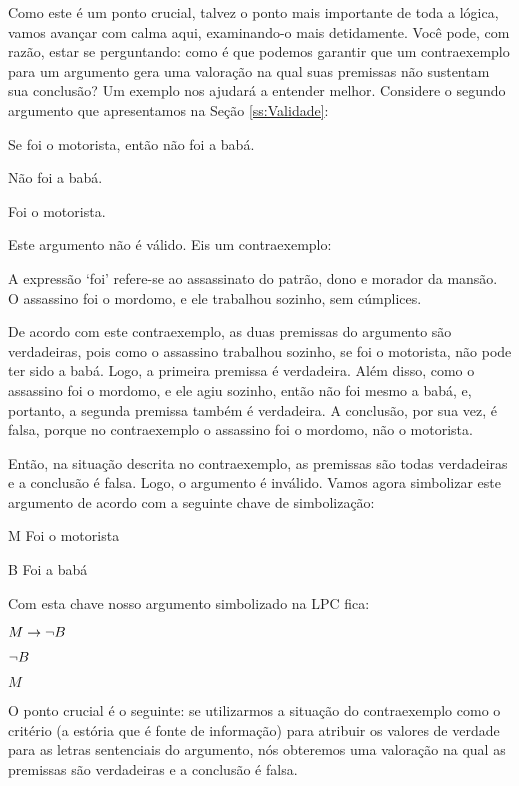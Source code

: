 Como este é um ponto crucial, talvez o ponto mais importante de toda a lógica, vamos avançar com calma aqui, examinando-o mais detidamente.
Você pode, com razão, estar se perguntando:
como é que podemos garantir que um contraexemplo para um argumento gera uma valoração na qual suas premissas não sustentam sua conclusão?
Um exemplo nos ajudará a entender melhor.
Considere o segundo argumento que apresentamos na Seção \ref{ss:Validade}:
\begin{earg}
	\item[] Se foi o motorista, então não foi a babá.
	\item[] Não foi a babá.
	\item[\therefore] Foi o motorista.
\end{earg}
Este argumento não é válido.
Eis um contraexemplo:
\begin{ebullet}
	\item A expressão `foi' refere-se ao assassinato do patrão, dono e morador da mansão.
	O assassino foi o mordomo, e ele trabalhou sozinho, sem cúmplices.
\end{ebullet}

De acordo com este contraexemplo, as duas premissas do argumento são verdadeiras, pois como o assassino trabalhou sozinho, se foi o motorista, não pode ter sido a babá.
Logo, a primeira premissa é verdadeira.
Além disso, como o assassino foi o mordomo, e ele agiu sozinho, então não foi mesmo a babá, e, portanto, a segunda premissa também é verdadeira.
A conclusão, por sua vez, é falsa, porque no contraexemplo o assassino foi o mordomo, não o motorista.

Então, na situação descrita no contraexemplo, as premissas são todas verdadeiras e a conclusão é falsa.
Logo, o argumento é inválido.
Vamos agora simbolizar este argumento de acordo com a seguinte chave de simbolização:
	\begin{ekey}
		\item[M] Foi o motorista
		\item[B] Foi a babá
	\end{ekey}
Com esta chave nosso argumento simbolizado na LPC fica:
\begin{earg}
	\item[] $M \rightarrow \neg B$
	\item[] $\neg B$
	\item[\therefore] $M$
\end{earg}
O ponto crucial é o seguinte:
se utilizarmos a situação do contraexemplo como o critério (a estória que é fonte de informação) para atribuir os valores de verdade para as letras sentenciais do argumento, nós obteremos uma valoração na qual as premissas são verdadeiras e a conclusão é falsa.

